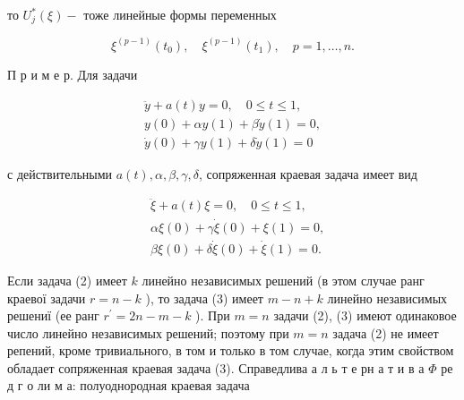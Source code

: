 \documentclass[10pt]{article}
\begin{document}
то $U_{j}^{*}(\xi)-$ тоже линейные формы переменных



\[

\xi^{(p-1)}\left(t_{0}\right), \quad \xi^{(p-1)}\left(t_{1}\right), \quad p=1, \ldots, n .

\]



П р и м е р. Для задачи



\[

\begin{gathered}

\ddot{y}+a(t) y=0, \quad 0 \leqslant t \leqslant 1, \\

y(0)+\alpha y(1)+\beta \dot{y}(1)=0, \\

\dot{y}(0)+\gamma y(1)+\delta \dot{y}(1)=0

\end{gathered}

\]



с действительными $a(t), \alpha, \beta, \gamma, \delta$, сопряженная краевая задача имеет вид



\[

\begin{aligned}

& \ddot{\xi}+a(t) \xi=0, \quad 0 \leqslant t \leqslant 1, \\

& \alpha \xi(0)+\gamma \dot{\xi}(0)+\xi(1)=0, \\

& \beta \xi(0)+\delta \dot{\xi}(0)+\dot{\xi}(1)=0 .

\end{aligned}

\]



Если задача (2) имеет $k$ линейно независимых решений (в этом случае ранг краевої задачи $r=n-k$ ), то задача (3) имеет $m-n+k$ линейно независимых решениї (ее ранг $r^{\prime}=2 n-m-k$ ). При $m=n$ задачи (2), (3) имеют одинаковое число линейно независимых решений; поэтому при $m=n$ задача (2) не имеет репений, кроме тривиального, в том и только в том случае, когда этим свойством обладает сопряженная краевая задача (3). Справедлива а л ь т е рн а т и в а $\Phi$ ре д г о ли м а: полуоднородная краевая задача
\end{document}
